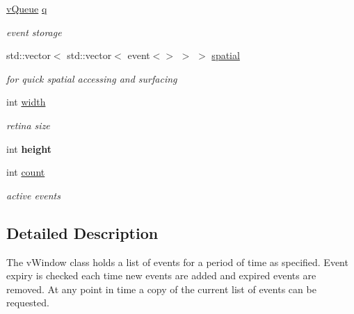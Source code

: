 \begin{DoxyCompactItemize}
\item 
\hyperlink{classev_1_1vQueue}{v\+Queue} \hyperlink{classev_1_1vSurface2_ad26e2a77d859924e39526fe69ad6e8bf}{q}\hypertarget{classev_1_1vSurface2_ad26e2a77d859924e39526fe69ad6e8bf}{}\label{classev_1_1vSurface2_ad26e2a77d859924e39526fe69ad6e8bf}

\begin{DoxyCompactList}\small\item\em event storage \end{DoxyCompactList}\item 
std\+::vector$<$ std\+::vector$<$ event$<$$>$ $>$ $>$ \hyperlink{classev_1_1vSurface2_aeea3647a3da9c08bd0f3bd577e6ba443}{spatial}\hypertarget{classev_1_1vSurface2_aeea3647a3da9c08bd0f3bd577e6ba443}{}\label{classev_1_1vSurface2_aeea3647a3da9c08bd0f3bd577e6ba443}

\begin{DoxyCompactList}\small\item\em for quick spatial accessing and surfacing \end{DoxyCompactList}\item 
int \hyperlink{classev_1_1vSurface2_a1aa8027816352a15d5b9bf1f26f48e76}{width}\hypertarget{classev_1_1vSurface2_a1aa8027816352a15d5b9bf1f26f48e76}{}\label{classev_1_1vSurface2_a1aa8027816352a15d5b9bf1f26f48e76}

\begin{DoxyCompactList}\small\item\em retina size \end{DoxyCompactList}\item 
int {\bfseries height}\hypertarget{classev_1_1vSurface2_a4cac3483eefdbe9e83ced2ef6bc5f7b2}{}\label{classev_1_1vSurface2_a4cac3483eefdbe9e83ced2ef6bc5f7b2}

\item 
int \hyperlink{classev_1_1vSurface2_a53cfa9932bf60007440cbf535c115222}{count}\hypertarget{classev_1_1vSurface2_a53cfa9932bf60007440cbf535c115222}{}\label{classev_1_1vSurface2_a53cfa9932bf60007440cbf535c115222}

\begin{DoxyCompactList}\small\item\em active events \end{DoxyCompactList}\end{DoxyCompactItemize}


\subsection{Detailed Description}
The v\+Window class holds a list of events for a period of time as specified. Event expiry is checked each time new events are added and expired events are removed. At any point in time a copy of the current list of events can be requested. 

